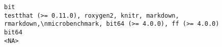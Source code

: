 \documentclass[
  letterpaper,
  DIV=11,
  numbers=noendperiod]{scrreprt}
\begin{document}
\begin{verbatim}
bit                                                                                                                                                                                                                                                                                                                                                                                                                                                                                                                                                                                                                                                                                                                                                                                                                                                                                                                                                                                                                                                                                                                                                                                              testthat (>= 0.11.0), roxygen2, knitr, markdown, rmarkdown,\nmicrobenchmark, bit64 (>= 4.0.0), ff (>= 4.0.0)
bit64                                                                                                                                                                                                                                                                                                                                                                                                                                                                                                                                                                                                                                                                                                                                                                                                                                                                                                                                                                                                                                                                                                                                                                                                                                                                                                    <NA>

\end{verbatim}
\end{document}
